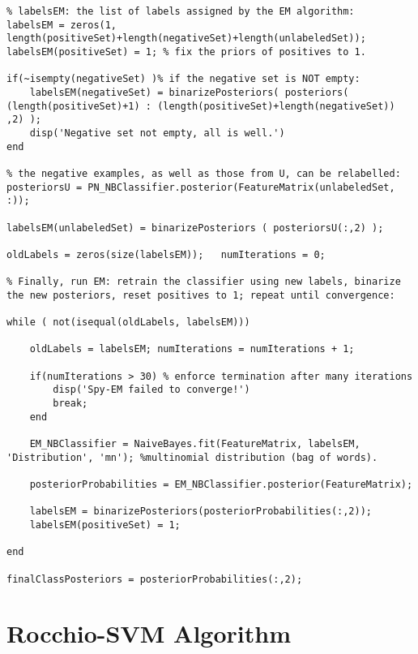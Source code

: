 \documentclass[12pt,twoside,notitlepage,amsart]{report} %
\begin{document}
\begin{lstlisting}
% labelsEM: the list of labels assigned by the EM algorithm:
labelsEM = zeros(1, length(positiveSet)+length(negativeSet)+length(unlabeledSet));
labelsEM(positiveSet) = 1; % fix the priors of positives to 1.

if(~isempty(negativeSet) )% if the negative set is NOT empty:
    labelsEM(negativeSet) = binarizePosteriors( posteriors( (length(positiveSet)+1) : (length(positiveSet)+length(negativeSet)) ,2) );
    disp('Negative set not empty, all is well.')
end

% the negative examples, as well as those from U, can be relabelled:
posteriorsU = PN_NBClassifier.posterior(FeatureMatrix(unlabeledSet, :));
   
labelsEM(unlabeledSet) = binarizePosteriors ( posteriorsU(:,2) );

oldLabels = zeros(size(labelsEM));   numIterations = 0;

% Finally, run EM: retrain the classifier using new labels, binarize the new posteriors, reset positives to 1; repeat until convergence:

while ( not(isequal(oldLabels, labelsEM)))

    oldLabels = labelsEM; numIterations = numIterations + 1;
    
    if(numIterations > 30) % enforce termination after many iterations
        disp('Spy-EM failed to converge!')
        break;
    end
    
    EM_NBClassifier = NaiveBayes.fit(FeatureMatrix, labelsEM, 'Distribution', 'mn'); %multinomial distribution (bag of words).
    
    posteriorProbabilities = EM_NBClassifier.posterior(FeatureMatrix);

    labelsEM = binarizePosteriors(posteriorProbabilities(:,2));
    labelsEM(positiveSet) = 1;
        
end

finalClassPosteriors = posteriorProbabilities(:,2);

\end{lstlisting}
	
	\clearpage
	
	
	\section{Rocchio-SVM Algorithm} %
	
\end{document}
